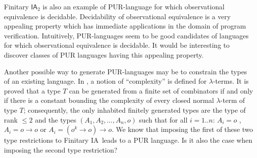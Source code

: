 \documentclass{llncs}
\newcommand\ialgol{\textsf{IA}}
\begin{document}
Finitary $\ialgol_2$ is also an example of PUR-language for which
observational equivalence is decidable. Decidability of observational equivalence is a very
appealing property which has immediate applications in the domain of
program verification. Intuitively, PUR-languages seem to be good
candidates of languages for which observational equivalence is
decidable. It would be interesting to discover classes of PUR
languages having this appealing property.

Another possible way to generate PUR-languages may be to constrain
the types of an existing language. In \cite{DBLP:conf/tlca/Joly01},
a notion of ``complexity'' is defined for $\lambda$-terms. It is
proved that a type $T$ can be generated from a finite set of
combinators if and only if there is a constant bounding the
complexity of every closed normal $\lambda$-term of type $T$;
consequently, the only inhabited finitely generated types are the
type of rank $\leq 2$ and the types $(A_1, A_2, \ldots, A_n, o)$
such that for all $i = 1..n$: $A_i = o$ , $A_i = o \rightarrow o$ or
$A_i = (o^k \rightarrow o) \rightarrow o$. We know that imposing the
first of these two type restrictions to Finitary \ialgol\ leads to a
PUR language. Is it also the case when imposing the second type
restriction?






\end{document}

